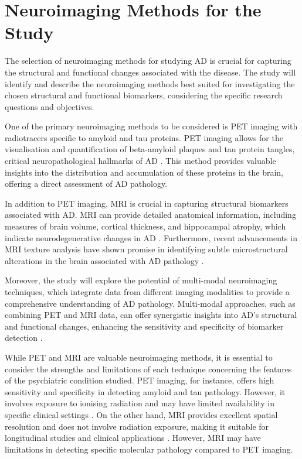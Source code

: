 \documentclass[10pt]{article}
\begin{document}
\begin{sloppypar}
  \section{Neuroimaging Methods for the Study}
  \label{sec:neuroimaging-methods}

  The selection of neuroimaging methods for studying AD is crucial for capturing the structural and functional changes associated with the disease. The study will identify and describe the neuroimaging methods best suited for investigating the chosen structural and functional biomarkers, considering the specific research questions and objectives.

  One of the primary neuroimaging methods to be considered is PET imaging with radiotracers specific to amyloid and tau proteins. PET imaging allows for the visualisation and quantification of beta-amyloid plaques and tau protein tangles, critical neuropathological hallmarks of AD \citep{jack_serial_2009}. This method provides valuable insights into the distribution and accumulation of these proteins in the brain, offering a direct assessment of AD pathology.

  In addition to PET imaging, MRI is crucial in capturing structural biomarkers associated with AD. MRI can provide detailed anatomical information, including measures of brain volume, cortical thickness, and hippocampal atrophy, which indicate neurodegenerative changes in AD \citep{cai_magnetic_2020}. Furthermore, recent advancements in MRI texture analysis have shown promise in identifying subtle microstructural alterations in the brain associated with AD pathology \citep{cai_magnetic_2020}.

  Moreover, the study will explore the potential of multi-modal neuroimaging techniques, which integrate data from different imaging modalities to provide a comprehensive understanding of AD pathology. Multi-modal approaches, such as combining PET and MRI data, can offer synergistic insights into AD's structural and functional changes, enhancing the sensitivity and specificity of biomarker detection \citep{ran_multimodal_2022}.

  While PET and MRI are valuable neuroimaging methods, it is essential to consider the strengths and limitations of each technique concerning the features of the psychiatric condition studied. PET imaging, for instance, offers high sensitivity and specificity in detecting amyloid and tau pathology. However, it involves exposure to ionising radiation and may have limited availability in specific clinical settings \citep{bao_pet_2021}. On the other hand, MRI provides excellent spatial resolution and does not involve radiation exposure, making it suitable for longitudinal studies and clinical applications \citep{cai_magnetic_2020}. However, MRI may have limitations in detecting specific molecular pathology compared to PET imaging.


\end{sloppypar}
\end{document}
